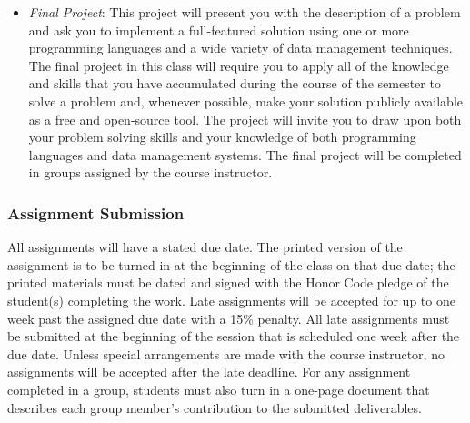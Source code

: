 \begin{itemize}

  \item {\em Final Project}: This project will present you with the description of a problem and ask you to implement
    a full-featured solution using one or more programming languages and a wide variety of data management techniques.
    The final project in this class will require you to apply all of the knowledge and skills that you have
    accumulated during the course of the semester to solve a problem and, whenever possible, make your solution
    publicly available as a free and open-source tool.  The project will invite you to draw upon both your problem
    solving skills and your knowledge of both programming languages and data management systems. The final project will
    be completed in groups assigned by the course instructor.

\end{itemize}

\subsubsection*{Assignment Submission}

All assignments will have a stated due date. The printed version of the assignment is to be turned in at the beginning
of the class on that due date; the printed materials must be dated and signed with the Honor Code pledge of the
student(s) completing the work.  Late assignments will be accepted for up to one week past the assigned due date with a
15\% penalty. All late assignments must be submitted at the beginning of the session that is scheduled one week after
the due date. Unless special arrangements are made with the course instructor, no assignments will be accepted after the
late deadline. For any assignment completed in a group, students must also turn in a one-page document that describes
each group member's contribution to the submitted deliverables.  


